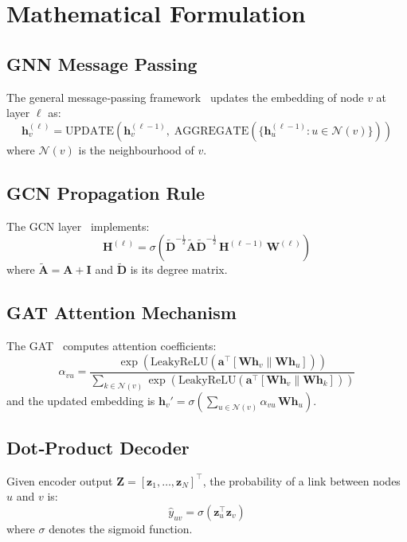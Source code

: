 \documentclass[conference]{IEEEtran}
\begin{document}
\section{Mathematical Formulation}\label{sec:math}
\subsection{GNN Message Passing}
The general message‑passing framework~\cite{gilmer2017} updates the embedding of node $v$ at layer $\ell$ as:
\begin{equation}
\mathbf{h}_v^{(\ell)} = \text{UPDATE}\!\left(\mathbf{h}_v^{(\ell-1)},\; \text{AGGREGATE}\!\left(\{\mathbf{h}_u^{(\ell-1)} : u \in \mathcal{N}(v)\}\right)\right)
\label{eq:mp}
\end{equation}
where $\mathcal{N}(v)$ is the neighbourhood of $v$.

\subsection{GCN Propagation Rule}
The GCN layer~\cite{kipf2017} implements:
\begin{equation}
\mathbf{H}^{(\ell)} = \sigma\!\left(\tilde{\mathbf{D}}^{-\frac{1}{2}}\tilde{\mathbf{A}}\tilde{\mathbf{D}}^{-\frac{1}{2}}\,\mathbf{H}^{(\ell-1)}\,\mathbf{W}^{(\ell)}\right)
\label{eq:gcn}
\end{equation}
where $\tilde{\mathbf{A}}=\mathbf{A}+\mathbf{I}$ and $\tilde{\mathbf{D}}$ is its degree matrix.

\subsection{GAT Attention Mechanism}
The GAT~\cite{velickovic2018} computes attention coefficients:
\begin{equation}
\alpha_{vu}=\frac{\exp\!\left(\text{LeakyReLU}\!\left(\mathbf{a}^\top[\mathbf{W}\mathbf{h}_v\|\mathbf{W}\mathbf{h}_u]\right)\right)}{\sum_{k\in\mathcal{N}(v)}\exp\!\left(\text{LeakyReLU}\!\left(\mathbf{a}^\top[\mathbf{W}\mathbf{h}_v\|\mathbf{W}\mathbf{h}_k]\right)\right)}
\label{eq:gat}
\end{equation}
and the updated embedding is $\mathbf{h}_v' = \sigma\!\left(\sum_{u\in\mathcal{N}(v)} \alpha_{vu}\,\mathbf{W}\mathbf{h}_u\right)$.

\subsection{Dot‑Product Decoder}
Given encoder output $\mathbf{Z}= [\mathbf{z}_1,\ldots,\mathbf{z}_N]^\top$, the probability of a link between nodes $u$ and $v$ is:
\begin{equation}
\hat{y}_{uv}=\sigma\!\left(\mathbf{z}_u^{\top}\mathbf{z}_v\right)
\label{eq:decoder}
\end{equation}
where $\sigma$ denotes the sigmoid function.
\end{document}
